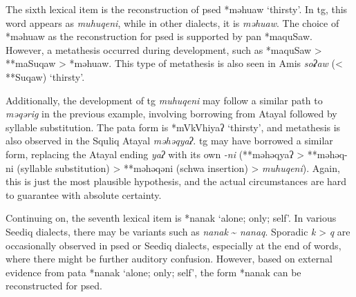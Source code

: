 The sixth lexical item is the reconstruction of \acl{psed} *məhuaw `thirsty'. In \acl{tg}, this word appears as \textit{muhuqeni}, while in other dialects, it is \textit{məhuaw}. The choice of *məhuaw as the reconstruction for \acl{psed} is supported by \acl{pan} *maquSaw. However, a metathesis occurred during development, such as *maquSaw > **maSuqaw > *məhuaw. This type of metathesis is also seen in Amis \textit{soʡaw} (< **Suqaw) `thirsty'. 

Additionally, the development of \acl{tg} \textit{muhuqeni} may follow a similar path to \textit{məqərig} in the previous example, involving borrowing from Atayal followed by syllable substitution. The \acl{pata} form is *mVkVhiyaʔ `thirsty', and metathesis is also observed in the Squliq Atayal \textit{məhəqyaʔ}. \acl{tg} may have borrowed a similar form, replacing the Atayal ending \textit{yaʔ} with its own \textit{-ni} (**məhəqyaʔ > **məhəq-ni (syllable substitution) > **məhəqəni (schwa insertion) > \textit{muhuqeni}). Again, this is just the most plausible hypothesis, and the actual circumstances are hard to guarantee with absolute certainty.


Continuing on, the seventh lexical item is *nanak `alone; only; self'. In various Seediq dialects, there may be variants such as \textit{nanak} \~{} \textit{nanaq}. Sporadic \textit{k} > \textit{q} are occasionally observed in \acl{psed} or Seediq dialects, especially at the end of words, where there might be further auditory confusion. However, based on external evidence from \acl{pata} *nanak `alone; only; self', the form *nanak can be reconstructed for \acl{psed}.


